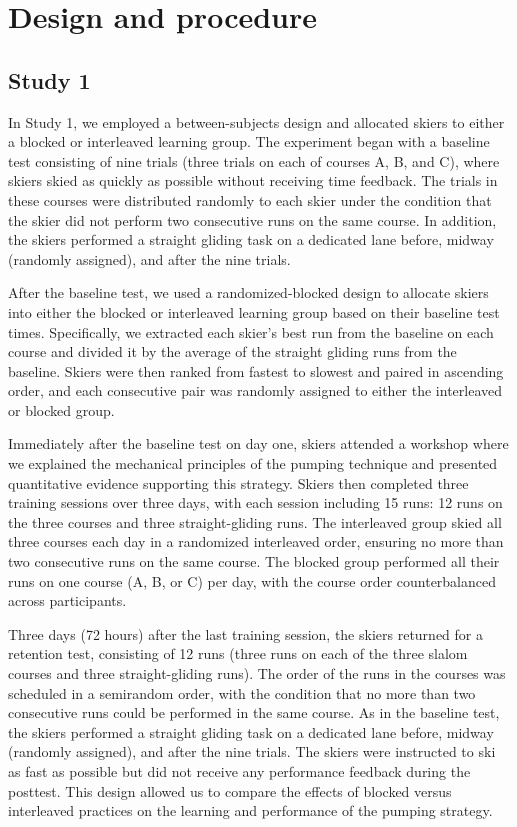\section{Design and procedure}

\subsection{Study 1}
In Study 1, we employed a between-subjects design and allocated skiers to either a blocked or interleaved learning group. The experiment began with a baseline test consisting of nine trials (three trials on each of courses A, B, and C), where skiers skied as quickly as possible without receiving time feedback. The trials in these courses were distributed randomly to each skier under the condition that the skier did not perform two consecutive runs on the same course. In addition, the skiers performed a straight gliding task on a dedicated lane before, midway (randomly assigned), and after the nine trials.

After the baseline test, we used a randomized-blocked design to allocate skiers into either the blocked or interleaved learning group based on their baseline test times. Specifically, we extracted each skier's best run from the baseline on each course and divided it by the average of the straight gliding runs from the baseline. Skiers were then ranked from fastest to slowest and paired in ascending order, and each consecutive pair was randomly assigned to either the interleaved or blocked group.

Immediately after the baseline test on day one, skiers attended a workshop where we explained the mechanical principles of the pumping technique and presented quantitative evidence supporting this strategy. Skiers then completed three training sessions over three days, with each session including 15 runs: 12 runs on the three courses and three straight-gliding runs. The interleaved group skied all three courses each day in a randomized interleaved order, ensuring no more than two consecutive runs on the same course. The blocked group performed all their runs on one course (A, B, or C) per day, with the course order counterbalanced across participants. 

Three days (72 hours) after the last training session, the skiers returned for a retention test, consisting of 12 runs (three runs on each of the three slalom courses and three straight-gliding runs). The order of the runs in the courses was scheduled in a semirandom order, with the condition that no more than two consecutive runs could be performed in the same course. As in the baseline test, the skiers performed a straight gliding task on a dedicated lane before, midway (randomly assigned), and after the nine trials. The skiers were instructed to ski as fast as possible but did not receive any performance feedback during the posttest. This design allowed us to compare the effects of blocked versus interleaved practices on the learning and performance of the pumping strategy. 


